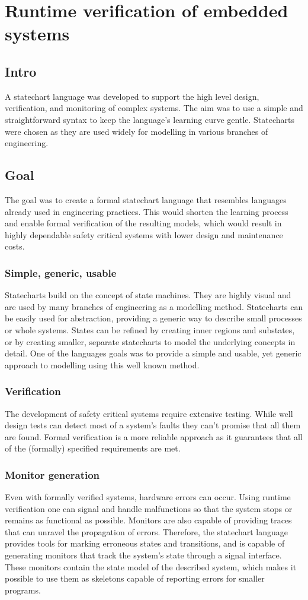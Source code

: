 \documentclass{book}
\begin{document}
\chapter{Runtime verification of embedded systems}
\label{chap:runtime_verification}

\section{Intro}
A statechart language was developed to support the high level design, verification, and monitoring of complex systems. The aim was to use a simple and straightforward syntax to keep the language’s learning curve gentle. Statecharts were chosen as they are used widely for modelling in various branches of engineering.
\section{Goal}
The goal was to create a formal statechart language that resembles languages already used in engineering practices. This would shorten the learning process and enable formal verification of the resulting models, which would result in highly dependable safety critical systems with lower design and maintenance costs.
  \subsection{Simple, generic, usable}
Statecharts build on the concept of state machines. They are highly visual and are used by many branches of engineering as a modelling method. Statecharts can be easily used for abstraction, providing a generic way to describe small processes or whole systems. States can be refined by creating inner regions and substates, or by creating smaller, separate statecharts to model the underlying concepts in detail. One of the languages goals was to provide a simple and usable, yet generic approach to modelling using this well known method.
  \subsection{Verification}
The development of safety critical systems require extensive testing. While well design tests can detect most of a system's faults they can't promise that all them are found. Formal verification is a more reliable approach as it guarantees that all of the (formally) specified requirements are met.
  \subsection{Monitor generation}
Even with formally verified systems, hardware errors can occur. Using runtime verification one can signal and handle malfunctions so that the system stops or remains as functional as possible. Monitors are also capable of providing traces that can unravel the propagation of errors. Therefore, the statechart language provides tools for marking erroneous states and transitions, and is capable of generating monitors that track the system's state through a signal interface. These monitors contain the state model of the described system, which makes it possible to use them as skeletons capable of reporting errors for smaller programs.
\end{document}
